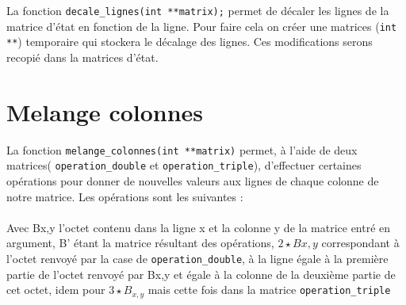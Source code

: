 \documentclass[10pt, a4paper]{report}
\begin{document}
	La fonction \verb|decale_lignes(int **matrix);| permet de décaler les lignes de la matrice d'état en fonction de la ligne. Pour faire cela on créer une matrices (\verb|int **|) temporaire qui stockera le décalage des lignes. Ces modifications serons recopié dans la matrices d'état.
	
	\section{Melange colonnes}
	
	La fonction \verb|melange_colonnes(int **matrix)| permet, à l'aide de deux matrices( \verb|operation_double| et \verb|operation_triple|), d'effectuer certaines opérations pour donner de nouvelles valeurs aux lignes de chaque colonne de notre matrice. Les opérations sont les suivantes : \\\\
	Avec B{x,y} l'octet contenu dans la ligne x et la colonne y de la matrice entré en argument, B' étant la matrice résultant des opérations,
	\begin{math}
		2\star B{x,y}  
	\end{math}
	correspondant à l'octet renvoyé par la case de \verb|operation_double|, à la ligne égale à la première partie de l'octet renvoyé par B{x,y} et égale à la colonne de la deuxième partie de cet octet, idem pour 
	\begin{math}
		3\star B_{x,y} 
	\end{math}
	mais cette fois dans la matrice \verb|operation_triple|
\end{document}
